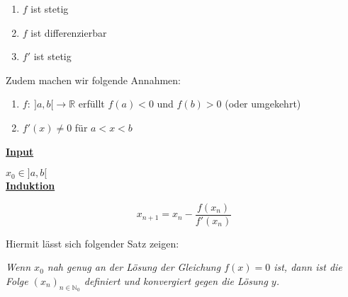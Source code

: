 \begin{enumerate}
	\item $f$ ist stetig
	\item  $f$ ist differenzierbar
	\item  $f'$ ist stetig
\end{enumerate}

Zudem machen wir folgende Annahmen:

\begin{enumerate}
	\item $f: \ ]a,b[\rightarrow \mathbb{R}$ erfüllt $f(a) < 0$ und $f(b) > 0$ (oder umgekehrt)
	
	\item $f'(x) \neq 0$ für $a<x<b$
\end{enumerate}


\underline{\textbf{Input}}

$x_0 \in ]a,b[$\\

\underline{\textbf{Induktion}}


$$x_{n+1} = x_n - \frac{f(x_n)}{f'(x_n)}$$


Hiermit lässt sich folgender Satz zeigen:

\emph{Wenn $x_0$ nah genug an der Lösung der Gleichung $f(x) = 0$ ist, dann ist die Folge $(x_n)_{n\in \mathbb{N}_0}$ definiert und konvergiert gegen die Lösung $y$.}

